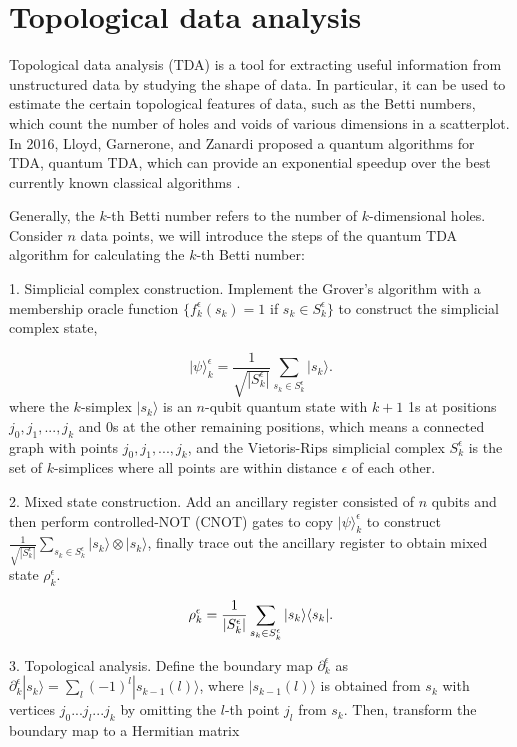 \documentclass[aps,pra,singlecolumn,superscriptaddress]{revtex4-1}
\begin{document}
\section{Topological data analysis}

Topological data analysis (TDA) \cite{carlsson2009topology} is a tool for extracting useful information from unstructured data by studying the shape of data. In particular, it can be used to estimate the certain topological features of data, such as the Betti numbers, which count the number of holes and voids of various dimensions in a scatterplot. In 2016, Lloyd, Garnerone, and Zanardi proposed a quantum algorithms for TDA, quantum TDA, which can provide an exponential speedup over the best currently known classical algorithms \cite{lloyd2016quantum}.

Generally, the $k$-th Betti number refers to the number of $k$-dimensional holes. Consider $n$ data points, we will introduce the steps of the quantum TDA algorithm for calculating the $k$-th Betti number:

1. Simplicial complex construction. Implement the Grover's algorithm with a membership oracle function $\{f_k^\epsilon ({s_k}) = 1$ if ${s_k} \in S_k^\epsilon \}$ to construct the simplicial complex state,

\[|\psi \rangle _k^\epsilon  = \frac{1}{{\sqrt {|S_k^\epsilon |} }}\sum_{{s_k} \in S_k^\epsilon } {|{s_k}\rangle }.\]
where the $k$-simplex $|s_k\rangle$ is an $n$-qubit quantum state with ${k+1}$ 1s at positions ${{j_0},{j_1},...,{j_k}}$ and 0s at the other remaining positions, which means a connected graph with points ${{j_0},{j_1},...,{j_k}}$, and the Vietoris-Rips simplicial complex ${S_k^\epsilon }$ is the set of ${k}$-simplices where all points are within distance ${\epsilon }$ of each other.

2. Mixed state construction. Add an ancillary register consisted of $n$ qubits and then perform controlled-NOT (CNOT) gates to copy $|\psi \rangle _k^\epsilon$ to construct ${\frac{1}{{\sqrt {|S_k^\epsilon |} }}\sum\limits_{{s_k} \in S_k^\epsilon } {|{s_k}\rangle }  \otimes |{s_k}\rangle }$, finally trace out the ancillary register to obtain mixed state ${\rho _k^\epsilon }$.

\[{\rho _k^\epsilon  = \frac{1}{|S_k^\epsilon |}\sum_{{s_k} \in S_k^\epsilon } {|{s_k}} \rangle \langle {s_k}{\rm{|}}}.\]

3. Topological analysis. Define the boundary map ${\partial _k^\epsilon }$ as $\partial _k^\epsilon |{s_k}\rangle  = \sum\limits_l {{{( - 1)}^l}} |{s_{k - 1}}(l)\rangle$, where ${|{s_{k - 1}}(l)\rangle }$ is obtained from ${{s_k}}$ with vertices ${{j_0}...{j_l}...{j_k}}$ by omitting the ${l}$-th point ${{j_l}}$ from ${{s_k}}$. Then, transform the boundary map to a Hermitian matrix
\end{document}
